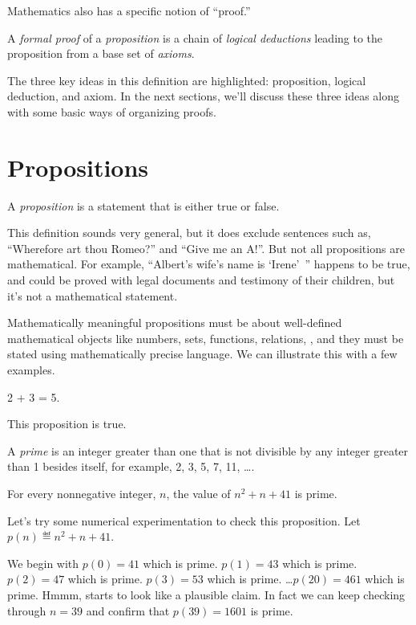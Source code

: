 Mathematics also has a specific notion of ``proof.''

\begin{definition*}
A \emph{formal proof} of a \emph{proposition} is a chain of \emph{logical
deductions} leading to the proposition from a base set of \emph{axioms}.
\end{definition*}

The three key ideas in this definition are highlighted: proposition,
logical deduction, and axiom.  In the next sections, we'll discuss these
three ideas along with some basic ways of organizing proofs.

\iffalse The last section contains some examples of complete proofs.\fi

\section{Propositions}

\begin{definition*}
A {\em proposition} is a statement that is either true or false.

\end{definition*}

This definition sounds very general, but it does exclude sentences
such as, ``Wherefore art thou Romeo?'' and ``Give me an A!''.
But not all propositions are mathematical.  For example, ``Albert's wife's
name is `Irene'~'' happens to be true, and could be proved with legal
documents and testimony of their children, but it's not a mathematical
statement.

Mathematically meaningful propositions must be about well-defined
mathematical objects like numbers, sets, functions, relations, \etc, and
they must be stated using mathematically precise language.  We can
illustrate this with a few examples.

\begin{proposition}
2 + 3 = 5.
\end{proposition}
%
This proposition is true.

A {\em prime} is an integer greater than one that is not divisible by any
integer greater than 1 besides itself, for example, 2, 3, 5, 7, 11, \dots.
\begin{proposition}\label{41}
For every nonnegative integer, $n$, the value of $n^2 + n + 41$ is prime.
\end{proposition}

Let's try some numerical experimentation to check this proposition.
Let $p(n) \eqdef  n^2 + n + 41$.
We begin with $p(0) = 41$ which is prime.  $p(1) = 43$ which is prime.  $p(2) = 47$
which is prime.  $p(3)=53$ which is prime. \dots $p(20) = 461$ which is
prime.  Hmmm, starts to look like a plausible claim.  In fact we can keep
checking through $n=39$ and confirm that $p(39)=1601$ is prime.

